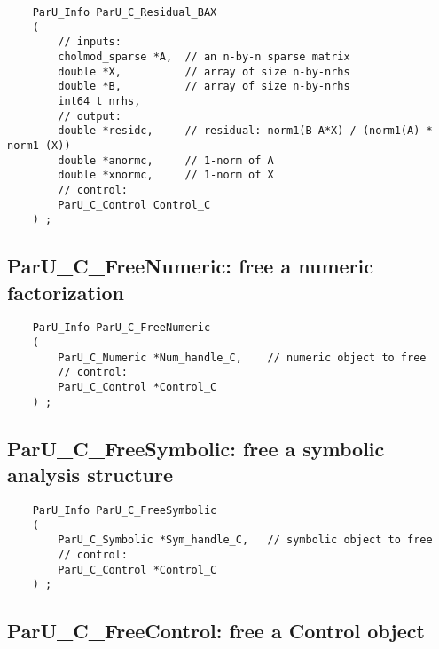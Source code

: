 \documentclass[12pt]{article}
\begin{document}
    {\footnotesize
    \begin{verbatim}
    ParU_Info ParU_C_Residual_BAX
    (
        // inputs:
        cholmod_sparse *A,  // an n-by-n sparse matrix
        double *X,          // array of size n-by-nrhs
        double *B,          // array of size n-by-nrhs
        int64_t nrhs,
        // output:
        double *residc,     // residual: norm1(B-A*X) / (norm1(A) * norm1 (X))
        double *anormc,     // 1-norm of A
        double *xnormc,     // 1-norm of X
        // control:
        ParU_C_Control Control_C
    ) ; \end{verbatim} }

\subsection{{\sf ParU\_C\_FreeNumeric}: free a numeric factorization}

    {\footnotesize
    \begin{verbatim}
    ParU_Info ParU_C_FreeNumeric
    (
        ParU_C_Numeric *Num_handle_C,    // numeric object to free
        // control:
        ParU_C_Control *Control_C
    ) ; \end{verbatim} }

\subsection{{\sf ParU\_C\_FreeSymbolic}: free a symbolic analysis structure}

    {\footnotesize
    \begin{verbatim}
    ParU_Info ParU_C_FreeSymbolic
    (
        ParU_C_Symbolic *Sym_handle_C,   // symbolic object to free
        // control:
        ParU_C_Control *Control_C
    ) ; \end{verbatim} }

\subsection{{\sf ParU\_C\_FreeControl}: free a Control object}
\end{document}
